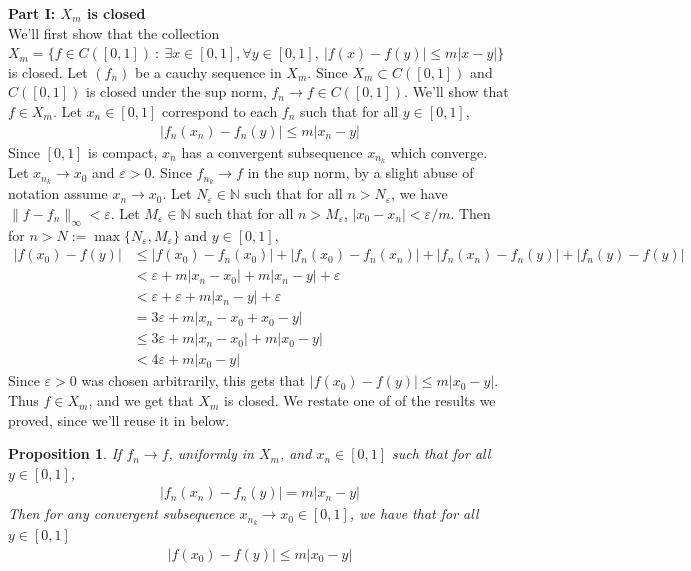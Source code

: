 \documentclass[12pt]{exam}
\theoremstyle{plain} %
\newtheorem{proposition}{Proposition}[section]
\theoremstyle{definition} %
\theoremstyle{remark} %
\begin{document}
\begin{questions}
  \question
  \begin{solution}
    \textbf{Part I: $X_m$ is closed}\\
    We'll first show that the collection $X_m = \{ f \in C([0, 1])
      \ : \ \exists x \in [0, 1], \forall y \in [0, 1], \ |f(x) - f(y)|
    \le m |x - y|  \}$ is closed. Let $(f_n)$ be a cauchy sequence in
    $X_m$. Since $X_m \subset C([0, 1])$ and $C([0 ,1 ])$ is closed
    under the sup norm, $f_n \to f \in C([0, 1])$. We'll show that $f \in X_m$.
    Let $x_n \in [0, 1]$ correspond to each $f_n$ such that for
    all $y \in [0, 1]$,
    \begin{align*}
      |f_n(x_n) - f_n(y)| \le m |x_n - y|
    \end{align*}
    Since $[0, 1]$ is compact, $x_n$ has a convergent subsequence
    $x_{n_k}$ which converge. Let $x_{n_k} \to x_0$ and $\varepsilon
    > 0$. Since $f_{n_k} \to f$ in the sup norm, by a slight abuse of
    notation assume $x_n \to x_0$.
    Let $N_\varepsilon \in \mathbb{N}$ such that for all $n >
    N_\varepsilon$, we have $\|f - f_n\|_\infty < \varepsilon$. Let
    $M_\varepsilon \in \mathbb{N}$ such that for all $n >
    M_\varepsilon$, $|x_0 - x_n| < \varepsilon/m$. Then for $n > N :=
    \max\{N_\varepsilon, M_\varepsilon\}$ and $y \in [0, 1]$,
    \begin{align*}
      |f(x_0) - f(y)| &\le |f(x_0) - f_n(x_0)| + |f_n(x_0) - f_n(x_n)|
      + |f_n(x_n) - f_n(y)| + |f_n(y) - f(y)| \\
      &< \varepsilon + m |x_n - x_0| + m|x_n - y| + \varepsilon \\
      &< \varepsilon + \varepsilon + m |x_n - y| + \varepsilon \\
      &= 3 \varepsilon + m|x_n - x_0 + x_0 - y| \\
      &\le 3 \varepsilon + m |x_n - x_0| + m |x_0 - y| \\
      &< 4 \varepsilon + m |x_0 - y|
    \end{align*}
    Since $\varepsilon > 0$ was chosen arbitrarily, this gets that
    $|f(x_0) - f(y)| \le m | x_0 - y|$. Thus $f \in X_m$, and we get
    that $X_m$ is closed. We restate one of of the results we proved,
    since we'll reuse it in below.

    \begin{proposition}
      \label{prop:4}
      If $f_n \to f$, uniformly in $X_m$, and $x_n \in
      [0, 1]$ such that  for all $y \in [0, 1]$,
      \begin{align*}
        |f_n(x_n) - f_n(y)| = m |x_n - y|
      \end{align*}
      Then for any convergent subsequence $x_{n_k} \to x_0 \in [0, 1]$, we have
      that for all $y \in [0, 1]$
      \begin{align*}
        |f(x_0) - f(y)| \le m |x_0 - y|
      \end{align*}
    \end{proposition}


\end{solution}
\end{questions}
\end{document}
